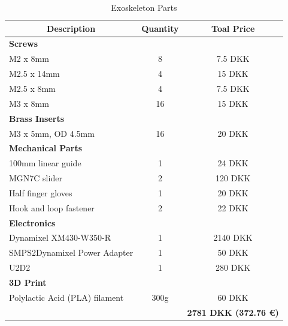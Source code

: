 \begin{table}[ht]
  \setlength{\abovecaptionskip}{6pt}
  \centering
  \begin{tabular}{|l|c|c|}
  \hline
  \multicolumn{1}{|c|}{\textbf{Description}} & \textbf{Quantity}                  & \textbf{Toal Price} \\ \hline
  \multicolumn{3}{|l|}{\textbf{Screws}} \\ \hline
  M2 x 8mm              & 8               & 7.5 DKK        \\ \hline
  M2.5 x 14mm              & 4               & 15 DKK        \\ \hline
  M2.5 x 8mm              & 4               & 7.5 DKK        \\ \hline
  M3 x 8mm              & 16               & 15 DKK       \\ \hline
  \multicolumn{3}{|l|}{\textbf{Brass Inserts}} \\ \hline
  M3 x 5mm, OD 4.5mm              & 16               & 20 DKK        \\ \hline
  \multicolumn{3}{|l|}{\textbf{Mechanical Parts}} \\ \hline
  100mm linear guide & 1 & 24 DKK  \\ \hline
  MGN7C slider & 2 & 120 DKK  \\ \hline
  Half finger gloves & 1 & 20 DKK \\ \hline
  Hook and loop fastener & 2 & 22 DKK \\ \hline
  \multicolumn{3}{|l|}{\textbf{Electronics}} \\ \hline
  Dynamixel XM430-W350-R & 1 & 2140 DKK \\ \hline
  SMPS2Dynamixel Power Adapter & 1 & 50 DKK \\ \hline
  U2D2 & 1 & 280 DKK \\ \hline
  \multicolumn{3}{|l|}{\textbf{3D Print}} \\ \hline
  Polylactic Acid (PLA) filament & 300g & 60 DKK \\ \hline
  & & \textbf{2781 DKK (372.76 €)} \\ \hline
  \end{tabular}
  \caption{\nametwo Exoskeleton Parts}
  \label{table:exoskeleton-2-parts}
\end{table}

